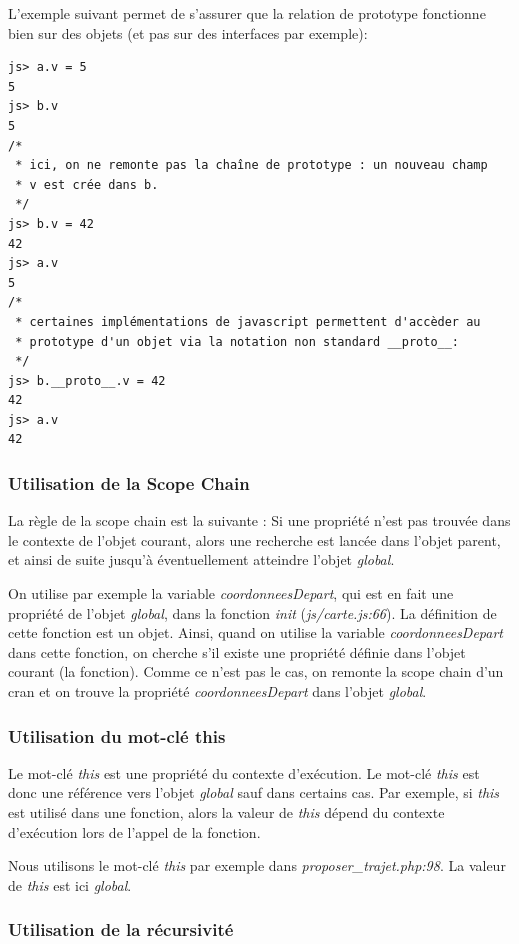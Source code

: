\documentclass[a4paper]{article}
\begin{document}
L'exemple suivant permet de s'assurer que la relation de prototype fonctionne
bien sur des objets (et pas sur des interfaces par exemple):
\begin{verbatim}
js> a.v = 5
5
js> b.v
5
/*
 * ici, on ne remonte pas la chaîne de prototype : un nouveau champ
 * v est crée dans b.
 */
js> b.v = 42
42
js> a.v
5
/*
 * certaines implémentations de javascript permettent d'accèder au
 * prototype d'un objet via la notation non standard __proto__:
 */
js> b.__proto__.v = 42
42
js> a.v
42
\end{verbatim}

\subsubsection{Utilisation de la Scope Chain}

La règle de la scope chain est la suivante :
Si une propriété n'est pas trouvée dans le contexte de l'objet courant,
alors une recherche est lancée dans l'objet parent, et ainsi de suite
jusqu'à éventuellement atteindre l'objet \textit{global}. 

On utilise par exemple la variable \textit{coordonneesDepart}, qui est en
 fait une propriété de l'objet \textit{global}, dans la fonction \textit{init} 
 (\textit{js/carte.js:66}). 
La définition de cette fonction est un objet. Ainsi, 
quand on utilise la variable \textit{coordonneesDepart} dans cette fonction,
on cherche s'il existe une propriété définie dans l'objet courant
(la fonction).
Comme ce n'est pas le cas, on remonte la scope chain d'un cran et on trouve
la propriété \textit{coordonneesDepart} dans l'objet \textit{global}.

\subsubsection{Utilisation du mot-clé this}

Le mot-clé \textit{this} est une propriété du contexte d'exécution.
Le mot-clé \textit{this} est donc une référence vers l'objet \textit{global} sauf
dans certains cas. Par exemple, si \textit{this} est utilisé dans une fonction,
alors la valeur de \textit{this} dépend du contexte d'exécution lors de l'appel
de la fonction. 

Nous utilisons le mot-clé \textit{this} par exemple dans \textit{proposer\_trajet.php:98}.
La valeur de \textit{this} est ici \textit{global}.

\subsubsection{Utilisation de la récursivité}
\end{document}
